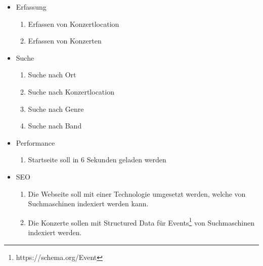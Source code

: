 \begin{itemize}
  \tightlist
  \item
        Erfassung
        \begin{enumerate}
          \def\labelenumi{\arabic{enumi}.}
          \tightlist
          \item
                Erfassen von Konzertlocation
          \item
                Erfassen von Konzerten
        \end{enumerate}
\end{itemize}

\begin{itemize}
  \tightlist
  \item
        Suche
        \begin{enumerate}
          \def\labelenumi{\arabic{enumi}.}
          \tightlist
          \item
                Suche nach Ort
          \item
                Suche nach Konzertlocation
          \item
                Suche nach Genre
          \item
                Suche nach Band
        \end{enumerate}
\end{itemize}

\begin{itemize}
  \tightlist
  \item
        Performance
        \begin{enumerate}
          \def\labelenumi{\arabic{enumi}.}
          \tightlist
          \item
                Startseite soll in 6 Sekunden geladen werden
        \end{enumerate}
\end{itemize}

\begin{itemize}
  \tightlist
  \item
        SEO
        \begin{enumerate}
          \def\labelenumi{\arabic{enumi}.}
          \tightlist
          \item
                Die Webseite soll mit einer Technologie umgesetzt werden, welche von
                Suchmaschinen indexiert werden kann.
          \item
                Die Konzerte sollen mit Structured Data für Events\footnote{https://schema.org/Event}
                von Suchmaschinen indexiert werden.
        \end{enumerate}
\end{itemize}

